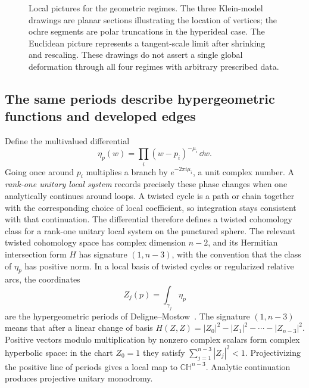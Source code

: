 \begin{figure}[htbp]
\caption[Euclidean, compact, ideal, and hyperideal regimes]{Local pictures for the geometric regimes. The three Klein-model
drawings are planar sections illustrating the location of vertices;
the ochre segments are polar truncations in the hyperideal case.
The Euclidean picture represents a tangent-scale limit after shrinking
and rescaling. These drawings do not assert a single global deformation
through all four regimes with arbitrary prescribed data.}
\label{fig:mono-polyhedral-regimes}
\end{figure}

\subsection{The same periods describe hypergeometric functions and developed edges}

Define the multivalued differential
\begin{equation}
 \eta_p(w)=\prod_i(w-p_i)^{-\mu_i}\,\dd w.
 \label{eq:DMdifferential}
\end{equation}
Going once around $p_i$ multiplies a branch by
$e^{-2\pi i\mu_i}$, a unit complex number. A \emph{rank-one
unitary local system} records precisely these phase changes when
one analytically continues around loops. A twisted cycle is a
path or chain together with the corresponding choice of local
coefficient, so integration stays consistent with that continuation.
The differential therefore defines a
twisted cohomology class for a rank-one unitary local system on the
punctured sphere. The relevant twisted cohomology space has complex
dimension $n-2$, and its Hermitian intersection form $H$ has signature
$(1,n-3)$, with the convention that the class of $\eta_p$ has positive
norm. In a local basis of twisted cycles or regularized relative arcs,
the coordinates
\begin{equation}
 Z_j(p)=\int_{\gamma_j}\eta_p
 \label{eq:DMperiods}
\end{equation}
are the hypergeometric periods of Deligne--Mostow~\cite{DeligneMostow}.
The signature $(1,n-3)$ means that after a linear change of basis
$H(Z,Z)=|Z_0|^2-|Z_1|^2-\cdots-|Z_{n-3}|^2$.
Positive vectors modulo multiplication by nonzero complex scalars
form complex hyperbolic space: in the chart $Z_0=1$ they satisfy
$\sum_{j=1}^{n-3}|Z_j|^2<1$.
Projectivizing the positive line of periods gives a local map to
$\mathbb{CH}^{n-3}$. Analytic continuation produces projective unitary
monodromy.

